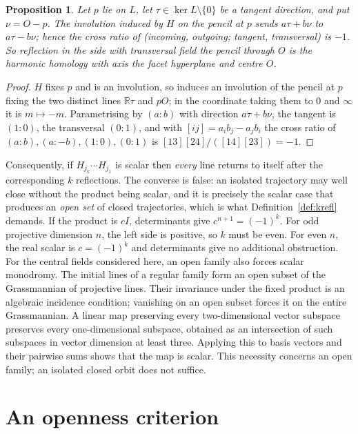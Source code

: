 \documentclass[11pt,a4paper]{article}
\theoremstyle{plain}
\newtheorem{proposition}[theorem]{Proposition}
\theoremstyle{definition}
\theoremstyle{remark}
\begin{document}
\begin{proposition}\label{prop:law}
Let $p$ lie on $L$, let $\tau\in\ker L\setminus\{0\}$ be a tangent direction, and
put $\nu=O-p$. The involution induced by $H$
on the pencil at $p$ sends $a\tau+b\nu$ to $a\tau-b\nu$; hence the cross ratio of
(incoming, outgoing; tangent, transversal) is $-1$. So reflection in the side with
transversal field the pencil through $O$ \emph{is} the harmonic homology with axis
the facet hyperplane and centre $O$.
\end{proposition}

\begin{proof}
$H$ fixes $p$ and is an involution, so induces an involution of the pencil at $p$
fixing the two distinct lines $\mathbb{R}\tau$ and $pO$; in the coordinate taking them to $0$
and $\infty$ it is $m\mapsto-m$. Parametrising by $(a:b)$ with direction
$a\tau+b\nu$, the tangent is $(1:0)$, the transversal $(0:1)$, and with
$[ij]=a_ib_j-a_jb_i$ the cross ratio of $(a:b),(a:-b),(1:0),(0:1)$ is
$[13][24]/([14][23])=-1$.
\end{proof}

Consequently, if $H_{j_k}\cdots H_{j_1}$ is scalar then \emph{every} line returns to
itself after the corresponding $k$ reflections. The converse is false: an isolated
trajectory may well close without the product being scalar, and it is precisely the
scalar case that produces an \emph{open set} of closed trajectories, which is what
Definition~\ref{def:krefl} demands. If the product is $cI$, determinants give
$c^{n+1}=(-1)^k$. For odd projective dimension $n$, the left side is positive,
so $k$ must be even. For even $n$, the real scalar is $c=(-1)^k$ and
determinants give no additional obstruction.
For the central fields considered here, an open family also forces scalar
monodromy. The initial lines of a regular family form an open subset of the
Grassmannian of projective lines. Their invariance under the fixed product
is an algebraic incidence condition; vanishing on an open subset forces
it on the entire Grassmannian. A linear map preserving every two-dimensional
vector subspace preserves every one-dimensional subspace, obtained as an
intersection of such subspaces in vector dimension at least three.
Applying this to basis vectors and their pairwise sums shows that the map
is scalar. This necessity concerns an open family; an isolated closed orbit
does not suffice.

\section{An openness criterion}
\end{document}

